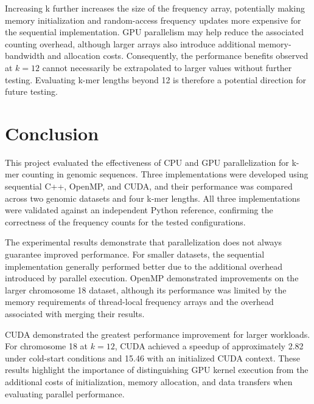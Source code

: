 \documentclass{article}
\begin{document}
\vspace{\baselineskip}

Increasing k further increases the size of the frequency array, potentially making memory initialization and random-access 
frequency updates more expensive for the sequential implementation. GPU parallelism may help reduce the associated counting 
overhead, although larger arrays also introduce additional memory-bandwidth and allocation costs. Consequently, the performance 
benefits observed at $k=12$ cannot necessarily be extrapolated to larger values without further testing. Evaluating k-mer lengths 
beyond 12 is therefore a potential direction for future testing.

\vspace{\baselineskip}

\section{Conclusion}

This project evaluated the effectiveness of CPU and GPU parallelization for k-mer counting in genomic
sequences. Three implementations were developed using sequential C++, OpenMP, and CUDA, and their
performance was compared across two genomic datasets and four k-mer lengths. All three implementations
were validated against an independent Python reference, confirming the correctness of the frequency
counts for the tested configurations.

\vspace{\baselineskip}

The experimental results demonstrate that parallelization does not always guarantee improved performance.
For smaller datasets, the sequential implementation generally performed better due to the additional
overhead introduced by parallel execution. OpenMP demonstrated improvements on the larger chromosome 18
dataset, although its performance was limited by the memory requirements of thread-local frequency arrays
and the overhead associated with merging their results.

\vspace{\baselineskip}

CUDA demonstrated the greatest performance improvement for larger workloads. For chromosome 18 at
$k=12$, CUDA achieved a speedup of approximately 2.82 under cold-start conditions and 15.46 with an
initialized CUDA context. These results highlight the importance of distinguishing GPU kernel execution
from the additional costs of initialization, memory allocation, and data transfers when evaluating
parallel performance.
\end{document}
